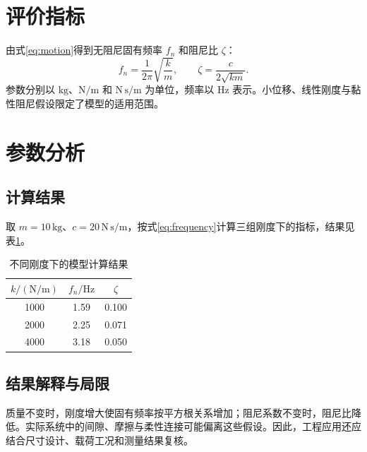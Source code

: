 \section{评价指标}
由式\eqref{eq:motion}得到无阻尼固有频率 $f_n$ 和阻尼比 $\zeta$：
\begin{equation}
  f_n=\frac{1}{2\pi}\sqrt{\frac{k}{m}},\qquad
  \zeta=\frac{c}{2\sqrt{km}}.
  \label{eq:frequency}
\end{equation}
参数分别以 $\mathrm{kg}$、$\mathrm{N/m}$ 和 $\mathrm{N\,s/m}$ 为单位，频率以 $\mathrm{Hz}$ 表示。小位移、线性刚度与黏性阻尼假设限定了模型的适用范围\cite{rao2011}。
\section{参数分析}
\subsection{计算结果}
取 $m=10\,\mathrm{kg}$、$c=20\,\mathrm{N\,s/m}$，按式\eqref{eq:frequency}计算三组刚度下的指标，结果见表\ref{tab:parameters}。

\begin{table}[htbp]
  \centering
  \caption{不同刚度下的模型计算结果}
  \label{tab:parameters}
  \begin{tabular}{ccc}
    \toprule
    $k/(\mathrm{N/m})$ & $f_n/\mathrm{Hz}$ & $\zeta$ \\
    \midrule
    1000 & 1.59 & 0.100 \\
    2000 & 2.25 & 0.071 \\
    4000 & 3.18 & 0.050 \\
    \bottomrule
  \end{tabular}
\end{table}

\subsection{结果解释与局限}
质量不变时，刚度增大使固有频率按平方根关系增加；阻尼系数不变时，阻尼比降低。实际系统中的间隙、摩擦与柔性连接可能偏离这些假设。因此，工程应用还应结合尺寸设计、载荷工况和测量结果复核\cite{shigley2015}。
